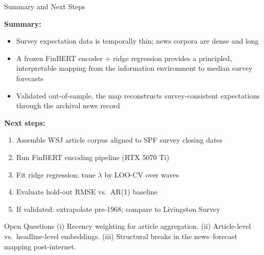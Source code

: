 \documentclass[aspectratio=169, 11pt]{beamer}
\newcommand{\lam}{\lambda}
\begin{document}
\begin{frame}{Summary and Next Steps}

\textbf{Summary:}
\begin{itemize}\itemsep1pt
  \item Survey expectation data is temporally thin; news corpora are dense and long
  \item A frozen FinBERT encoder + ridge regression provides a principled, interpretable mapping from the information environment to median survey forecasts
  \item Validated out-of-sample, the map reconstructs survey-consistent expectations through the archival news record
\end{itemize}

\vspace{0.2cm}
\textbf{Next steps:}
\begin{enumerate}\itemsep1pt
  \item Assemble WSJ article corpus aligned to SPF survey closing dates
  \item Run FinBERT encoding pipeline (RTX 5070 Ti)
  \item Fit ridge regression; tune $\lam$ by LOO-CV over waves
  \item Evaluate hold-out RMSE vs.\ AR(1) baseline
  \item If validated: extrapolate pre-1968; compare to Livingston Survey
\end{enumerate}

\vspace{0.15cm}
\begin{block}{Open Questions}
(i) Recency weighting for article aggregation. \;
(ii) Article-level vs.\ headline-level embeddings. \;
(iii) Structural breaks in the news--forecast mapping post-internet.
\end{block}

\end{frame}
\end{document}
